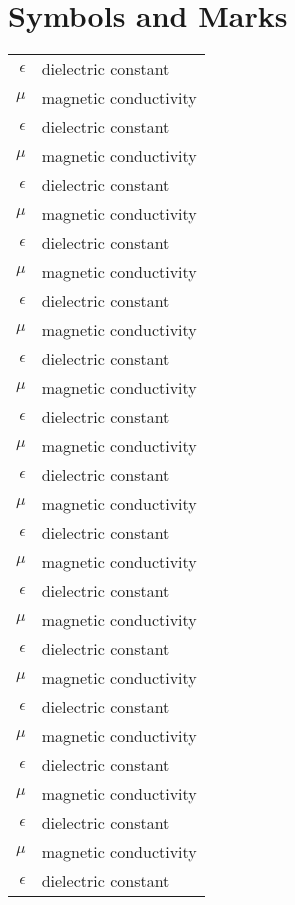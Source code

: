 \chapter{Symbols and Marks}

\begin{longtable}{rl}
  $\epsilon$ & dielectric constant   \\
  $\mu$      & magnetic conductivity \\
  $\epsilon$ & dielectric constant   \\
  $\mu$      & magnetic conductivity \\
  $\epsilon$ & dielectric constant   \\
  $\mu$      & magnetic conductivity \\
  $\epsilon$ & dielectric constant   \\
  $\mu$      & magnetic conductivity \\
  $\epsilon$ & dielectric constant   \\
  $\mu$      & magnetic conductivity \\
  $\epsilon$ & dielectric constant   \\
  $\mu$      & magnetic conductivity \\
  $\epsilon$ & dielectric constant   \\
  $\mu$      & magnetic conductivity \\
  $\epsilon$ & dielectric constant   \\
  $\mu$      & magnetic conductivity \\
  $\epsilon$ & dielectric constant   \\
  $\mu$      & magnetic conductivity \\
  $\epsilon$ & dielectric constant   \\
  $\mu$      & magnetic conductivity \\
  $\epsilon$ & dielectric constant   \\
  $\mu$      & magnetic conductivity \\
  $\epsilon$ & dielectric constant   \\
  $\mu$      & magnetic conductivity \\
  $\epsilon$ & dielectric constant   \\
  $\mu$      & magnetic conductivity \\
  $\epsilon$ & dielectric constant   \\
  $\mu$      & magnetic conductivity \\
  $\epsilon$ & dielectric constant   \\

\end{longtable}
